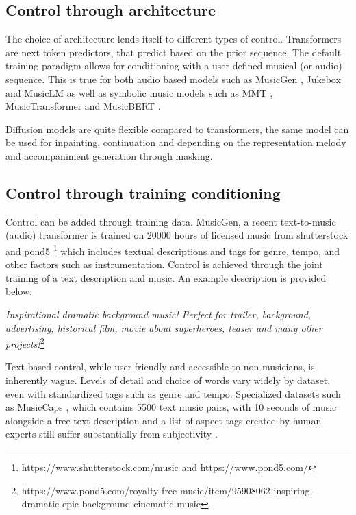 \subsection{Control through architecture}
The choice of architecture lends itself to different types of control. Transformers are next token predictors, that predict based on the prior sequence. The default training paradigm allows for conditioning with a user defined musical (or audio) sequence. This is true for both audio based models such as MusicGen \cite{copet2023simple}, Jukebox \cite{Dhariwal_Jun_Payne_Kim_Radford_Sutskever_2020} and MusicLM \cite{Agostinelli_Denk_Borsos_Engel_Verzetti_Caillon_Huang_Jansen_Roberts_Tagliasacchi_et_al._2023} as well as symbolic music models such as MMT \cite{Dong_Chen_MMT_Kirkpatrick_2023}, MusicTransformer \cite{Huang_Vaswani_Uszkoreit_Shazeer_Simon_Hawthorne_Dai_Hoffman_Dinculescu_Eck_2018} and MusicBERT \cite{Zeng_Tan_Wang_MUSICBERT_2021}. 

Diffusion models are quite flexible compared to transformers, the same model can be used for inpainting, continuation and depending on the representation melody and accompaniment generation through masking.\cite{Min_Jiang_Xia_Zhao_polyffusion_2023}\cite{Rombach_Blattmann_Lorenz_Esser_Ommer_2022}

\subsection{Control through training conditioning}
Control can be added through training data. MusicGen\cite{copet2023simple}, a recent text-to-music (audio) transformer is trained on 20000 hours of licensed music from shutterstock and pond5 \footnote{https://www.shutterstock.com/music and https://www.pond5.com/} which includes textual descriptions and tags for genre, tempo, and other factors such as instrumentation. Control is achieved through the joint training of a text description and music. An example description is provided below: 

\textit{Inspirational dramatic background music! Perfect for trailer, background, advertising, historical film, movie about superheroes, teaser and many other projects!}\footnote{ https://www.pond5.com/royalty-free-music/item/95908062-inspiring-dramatic-epic-background-cinematic-music
}

Text-based control, while user-friendly and accessible to non-musicians, is inherently vague. Levels of detail and choice of words vary widely by dataset, even with standardized tags such as genre and tempo. Specialized datasets such as MusicCaps \cite{Agostinelli_Denk_Borsos_Engel_Verzetti_Caillon_Huang_Jansen_Roberts_Tagliasacchi_et_al._2023}, which contains 5500 text music pairs, with 10 seconds of music alongside a free text description and a list of aspect tags created by human experts still suffer substantially from subjectivity \cite{Lee_Doh_Jeong_2023_subjectivity_musiccaps}. 

